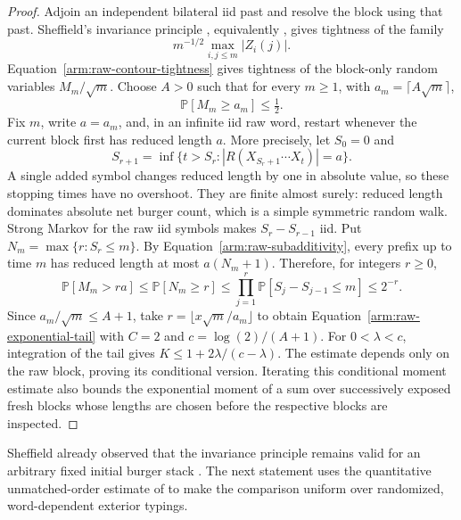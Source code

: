 \begin{proof}
Adjoin an independent bilateral iid past and resolve the block using
that past.  Sheffield's invariance principle
\cite[Theorem~2.5]{SheffieldInventory}, equivalently
\cite[Theorem~1.5]{GwynneMaoSunConeTimes}, gives tightness of the family
\[
 m^{-1/2}\max_{i,j\le m}|Z_i(j)|.
\]
Equation~\eqref{arm:raw-contour-tightness} gives tightness of the
block-only random variables $M_m/\sqrt m$.
Choose $A>0$ such that for every $m\ge1$, with
$a_m=\lceil A\sqrt m\rceil$,
\[
 \mathbb P[M_m\ge a_m]\le\tfrac12.
\]
Fix $m$, write $a=a_m$, and, in an infinite iid raw word, restart
whenever the current block first has reduced length $a$.
More precisely, let $S_0=0$ and
\[
 S_{r+1}=\inf\{t>S_r:|R(X_{S_r+1}\cdots X_t)|=a\}.
\]
A single added symbol changes reduced length by one in absolute
value, so these stopping times have no overshoot.  They are finite
almost surely: reduced length dominates absolute net burger count,
which is a simple symmetric random walk.  Strong Markov for the raw
iid symbols makes $S_r-S_{r-1}$ iid.  Put
$N_m=\max\{r:S_r\le m\}$.  By
Equation~\eqref{arm:raw-subadditivity}, every prefix up to time $m$
has reduced length at most $a(N_m+1)$.  Therefore, for integers $r\ge0$,
\[
 \mathbb P[M_m>ra]\le\mathbb P[N_m\ge r]
 \le\prod_{j=1}^r\mathbb P[S_j-S_{j-1}\le m]
 \le2^{-r}.
\]
Since $a_m/\sqrt m\le A+1$, take
$r=\lfloor x\sqrt m/a_m\rfloor$ to obtain
Equation~\eqref{arm:raw-exponential-tail} with
$C=2$ and $c=\log(2)/(A+1)$.  For $0<\lambda<c$, integration of the
tail gives $K\le1+2\lambda/(c-\lambda)$.
The estimate depends only on the raw block, proving its conditional
version.  Iterating this conditional moment estimate also bounds the
exponential moment of a sum over successively exposed fresh blocks
whose lengths are chosen before the respective blocks are inspected.
\end{proof}

Sheffield already observed that the invariance principle remains valid
for an arbitrary fixed initial burger stack
\cite[Remark~3.17]{SheffieldInventory}. The next statement uses the
quantitative unmatched-order estimate of
\cite[Lemma~3.7]{GwynneMaoSunConeTimes} to make the comparison uniform
over randomized, word-dependent exterior typings.

